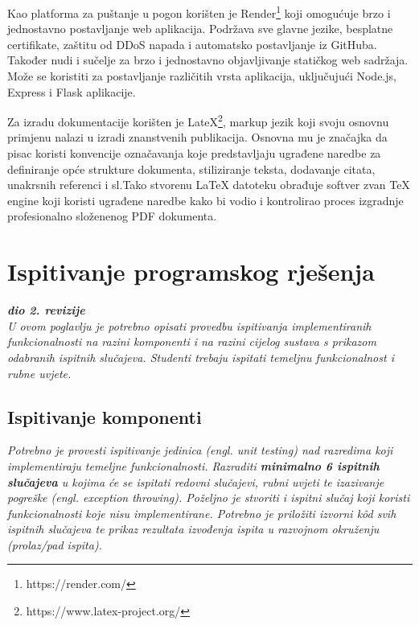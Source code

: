              Kao platforma za puštanje u pogon korišten je Render\footnote{https://render.com/} koji omogućuje brzo i jednostavno postavljanje web aplikacija. Podržava sve glavne jezike, besplatne certifikate, zaštitu od DDoS napada i automatsko postavljanje iz GitHuba. Također nudi i sučelje za brzo i jednostavno objavljivanje statičkog web sadržaja. Može se koristiti za postavljanje različitih vrsta aplikacija, uključujući Node.js, Express i Flask aplikacije.		 
			 
			 Za izradu dokumentacije korišten je LateX\footnote{https://www.latex-project.org/}, markup jezik koji svoju osnovnu primjenu nalazi u izradi znanstvenih publikacija. Osnovna mu je značajka da pisac koristi konvencije označavanja koje predstavljaju ugrađene naredbe za definiranje opće strukture dokumenta, stiliziranje teksta, dodavanje citata, unakrsnih referenci i sl.Tako stvorenu LaTeX datoteku obrađuje softver zvan TeX engine koji koristi ugrađene naredbe kako bi vodio i kontrolirao proces izgradnje profesionalno složenenog PDF dokumenta.
			\eject 
		
	
		\section{Ispitivanje programskog rješenja}
			
			\textbf{\textit{dio 2. revizije}}\\
			
			 \textit{U ovom poglavlju je potrebno opisati provedbu ispitivanja implementiranih funkcionalnosti na razini komponenti i na razini cijelog sustava s prikazom odabranih ispitnih slučajeva. Studenti trebaju ispitati temeljnu funkcionalnost i rubne uvjete.}
	
			
			\subsection{Ispitivanje komponenti}
			\textit{Potrebno je provesti ispitivanje jedinica (engl. unit testing) nad razredima koji implementiraju temeljne funkcionalnosti. Razraditi \textbf{minimalno 6 ispitnih slučajeva} u kojima će se ispitati redovni slučajevi, rubni uvjeti te izazivanje pogreške (engl. exception throwing). Poželjno je stvoriti i ispitni slučaj koji koristi funkcionalnosti koje nisu implementirane. Potrebno je priložiti izvorni kôd svih ispitnih slučajeva te prikaz rezultata izvođenja ispita u razvojnom okruženju (prolaz/pad ispita). }
			
			
			
